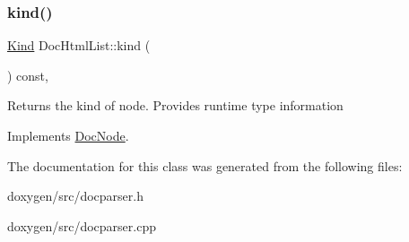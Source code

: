 \subsubsection{\texorpdfstring{kind()}{kind()}}
{\footnotesize\ttfamily \mbox{\hyperlink{class_doc_node_aebd16e89ca590d84cbd40543ea5faadb}{Kind}} Doc\+Html\+List\+::kind (\begin{DoxyParamCaption}{ }\end{DoxyParamCaption}) const\hspace{0.3cm}{\ttfamily [inline]}, {\ttfamily [virtual]}}

Returns the kind of node. Provides runtime type information 

Implements \mbox{\hyperlink{class_doc_node_a108ffd214a72ba6e93dac084a8f58049}{Doc\+Node}}.



The documentation for this class was generated from the following files\+:\begin{DoxyCompactItemize}
\item 
doxygen/src/docparser.\+h\item 
doxygen/src/docparser.\+cpp\end{DoxyCompactItemize}
